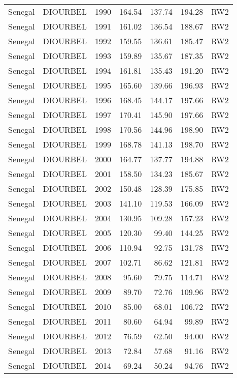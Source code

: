 \begin{longtable}{lllrrrl}
  Senegal & DIOURBEL & 1990 & 164.54 & 137.74 & 194.28 & RW2 \\ 
  Senegal & DIOURBEL & 1991 & 161.02 & 136.54 & 188.67 & RW2 \\ 
  Senegal & DIOURBEL & 1992 & 159.55 & 136.61 & 185.47 & RW2 \\ 
  Senegal & DIOURBEL & 1993 & 159.89 & 135.67 & 187.35 & RW2 \\ 
  Senegal & DIOURBEL & 1994 & 161.81 & 135.43 & 191.20 & RW2 \\ 
  Senegal & DIOURBEL & 1995 & 165.60 & 139.66 & 196.93 & RW2 \\ 
  Senegal & DIOURBEL & 1996 & 168.45 & 144.17 & 197.66 & RW2 \\ 
  Senegal & DIOURBEL & 1997 & 170.41 & 145.90 & 197.66 & RW2 \\ 
  Senegal & DIOURBEL & 1998 & 170.56 & 144.96 & 198.90 & RW2 \\ 
  Senegal & DIOURBEL & 1999 & 168.78 & 141.13 & 198.70 & RW2 \\ 
  Senegal & DIOURBEL & 2000 & 164.77 & 137.77 & 194.88 & RW2 \\ 
  Senegal & DIOURBEL & 2001 & 158.50 & 134.23 & 185.67 & RW2 \\ 
  Senegal & DIOURBEL & 2002 & 150.48 & 128.39 & 175.85 & RW2 \\ 
  Senegal & DIOURBEL & 2003 & 141.10 & 119.53 & 166.09 & RW2 \\ 
  Senegal & DIOURBEL & 2004 & 130.95 & 109.28 & 157.23 & RW2 \\ 
  Senegal & DIOURBEL & 2005 & 120.30 & 99.40 & 144.25 & RW2 \\ 
  Senegal & DIOURBEL & 2006 & 110.94 & 92.75 & 131.78 & RW2 \\ 
  Senegal & DIOURBEL & 2007 & 102.71 & 86.62 & 121.81 & RW2 \\ 
  Senegal & DIOURBEL & 2008 & 95.60 & 79.75 & 114.71 & RW2 \\ 
  Senegal & DIOURBEL & 2009 & 89.70 & 72.76 & 109.96 & RW2 \\ 
  Senegal & DIOURBEL & 2010 & 85.00 & 68.01 & 106.72 & RW2 \\ 
  Senegal & DIOURBEL & 2011 & 80.60 & 64.94 & 99.89 & RW2 \\ 
  Senegal & DIOURBEL & 2012 & 76.59 & 62.50 & 94.00 & RW2 \\ 
  Senegal & DIOURBEL & 2013 & 72.84 & 57.68 & 91.16 & RW2 \\ 
  Senegal & DIOURBEL & 2014 & 69.24 & 50.24 & 94.76 & RW2 \\ 

\end{longtable}
